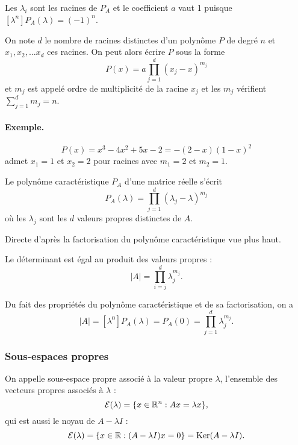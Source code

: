 \proof
Les $\lambda_i$ sont les racines de $P_A$ et le coefficient $a$ vaut 1 puisque $[\lambda^n]P_A(\lambda) = (-1)^n$.
\eproof

\begin{definition}
  On note $d$ le nombre de racines distinctes d'un polynôme $P$ de degré $n$ et $x_1, x_2, \dots x_d$ ces racines. On peut alors écrire $P$ sous la forme
  $$
  P(x) = a \prod_{j=1}^d (x_j - x)^{m_j}
  $$
  et $m_j$ est appelé ordre de multiplicité de la racine $x_j$ et les $m_j$ vérifient $ \sum_{j=1}^d m_j = n$.
\end{definition}

\paragraph*{Exemple.} 
$$
P(x) = x^3 - 4x^2 + 5x - 2 = - (2-x)(1-x)^2
$$ 
admet $x_1 = 1$ et $x_2 = 2$ pour racines avec $m_1 = 2$ et $m_2 = 1$.


\begin{corollary*}
  Le polynôme caractéristique $P_A$ d'une matrice réelle s'écrit
  $$
  P_A(\lambda) = \prod_{j=1}^d (\lambda_j - \lambda)^{m_j}
  $$
  où les $\lambda_j$ sont les $d$ valeurs propres distinctes de $A$.
\end{corollary*}

\proof
Directe d'après la factorisation du polynôme caractéristique vue plus haut.\eproof

\begin{corollary*}
  Le déterminant est égal au produit des valeurs propres : 
  $$
  |A| = \prod_{i=j}^d \lambda_j^{m_j}.
  $$
\end{corollary*}

\proof
  Du fait des propriétés du polynôme caractéristique et de sa factorisation, on a
  $$
  |A| = [\lambda^0]P_A(\lambda) = P_A(0) = \prod_{j=1}^d \lambda_j^{m_j}.
  $$
\eproof

\subsubsection{Sous-espaces propres} 

\begin{definition}
  On appelle sous-espace propre associé à la valeur propre $\lambda$, l'ensemble des vecteurs propres associés à $\lambda$ :
  $$
  \mathcal{E}(\lambda) = \{x \in \mathbb{R}^n: Ax = \lambda x\},
  $$
  qui est aussi le noyau de $A - \lambda I$ : 
  $$
  \mathcal{E}(\lambda) = \{x \in \mathbb{R}: (A - \lambda I)x = 0\} = \text{Ker}(A - \lambda I).
  $$
\end{definition}

